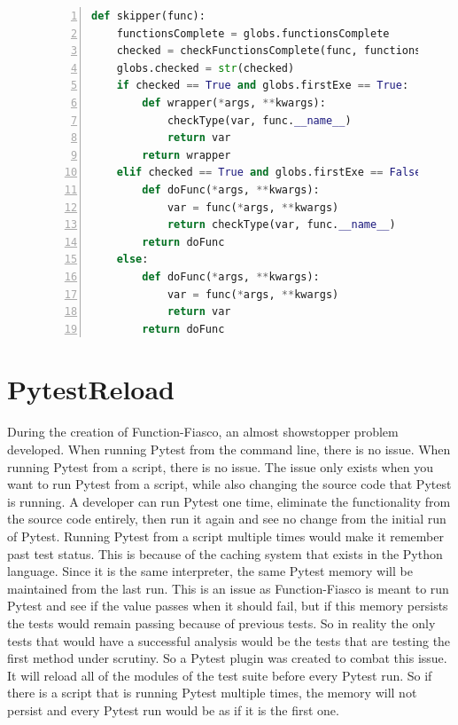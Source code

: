 \begin{figure}[t!]
\begin{lstlisting}[language = Python, numbers = left, frame = single, caption = Decorator that Function-Fiasco uses., label = decoratorFF]
def skipper(func):
    functionsComplete = globs.functionsComplete
    checked = checkFunctionsComplete(func, functionsComplete)
    globs.checked = str(checked)
    if checked == True and globs.firstExe == True:
        def wrapper(*args, **kwargs):
            checkType(var, func.__name__)
            return var
        return wrapper
    elif checked == True and globs.firstExe == False:
        def doFunc(*args, **kwargs):
            var = func(*args, **kwargs)
            return checkType(var, func.__name__)
        return doFunc
    else:
        def doFunc(*args, **kwargs):
            var = func(*args, **kwargs)
            return var
        return doFunc
\end{lstlisting}
\end{figure}




\section{PytestReload}
During the creation of Function-Fiasco, an almost showstopper problem developed. When running Pytest from the command line, there is no issue. When running Pytest from a script, there is no issue. The issue only exists when you want to run Pytest from a script, while also changing the source code that Pytest is running. A developer can run Pytest one time, eliminate the functionality from the source code entirely, then run it again and see no change from the initial run of Pytest. Running Pytest from a script multiple times would make it remember past test status. This is because of the caching system that exists in the Python language. Since it is the same interpreter, the same Pytest memory will be maintained from the last run. This is an issue as Function-Fiasco is meant to run Pytest and see if the value passes when it should fail, but if this memory persists the tests would remain passing because of previous tests. So in reality the only tests that would have a successful analysis would be the tests that are testing the first method under scrutiny. So a Pytest plugin was created to combat this issue. It will reload all of the modules of the test suite before every Pytest run. So if there is a script that is running Pytest multiple times, the memory will not persist and every Pytest run would be as if it is the first one.


